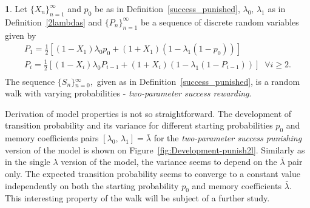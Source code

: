 \documentclass{amsart}
\theoremstyle{definition}
\newtheorem{defn}[thm]{\protect\definitionname}
\theoremstyle{plain}
\theoremstyle{plain}
\theoremstyle{plain}
\numberwithin{equation}{section}
\providecommand{\definitionname}{Definition}
\begin{document}
    \begin{defn}
        \label{2lambdas-reward}Let ${\{X_{n}\}}_{n=1}^{\infty}$ and $p_{0}$
        be as in Definition~\ref{success_punished}, $\lambda_{0},\,\lambda_{1}$
        as in Definition~\ref{2lambdas} and ${\{P_{n}\}}_{n=1}^{\infty}$ be a sequence
        of discrete random variables given by
        \begin{gather*}
            P_{1}=\frac{1}{2}[(1-X_{1})\lambda_{0}p_{0}+(1+X_{1})(1-\lambda_{1}(1-p_{0}))]\\
            P_{i}=\frac{1}{2}[(1-X_{i})\lambda_{0}P_{i-1}+(1+X_{i})(1-\lambda_{1}(1-P_{i-1}))]\;\;\forall i\geq2.\\
        \end{gather*}
        The sequence ${\{S_{n}\}}{}_{n=0}^{\infty},$ given as in Definition~\ref{success_punished}, is a random walk with varying probabilities - \emph{two-parameter success
        rewarding}.
    \end{defn}

    Derivation of model properties is not so straightforward.
    The development
    of transition probability and its variance for different starting
    probabilities $p_{0}$ and memory coefficients pairs $ [\lambda_{0},\,\lambda_{1}]=\bar{\lambda}$
    for the \emph{two-parameter success punishing} version of the model
    is shown on Figure~\ref{fig:Development-punish2l}.
    Similarly as in
    the single $\lambda$ version of the model, the variance seems to
    depend on the $\bar{\lambda}$ pair only.
    The expected transition
    probability seems to converge to a constant value independently on
    both the starting probability $p_{0}$ and memory coefficients $\bar{\lambda}$.
    This interesting property of the walk will be subject of a further study.
\end{document}
